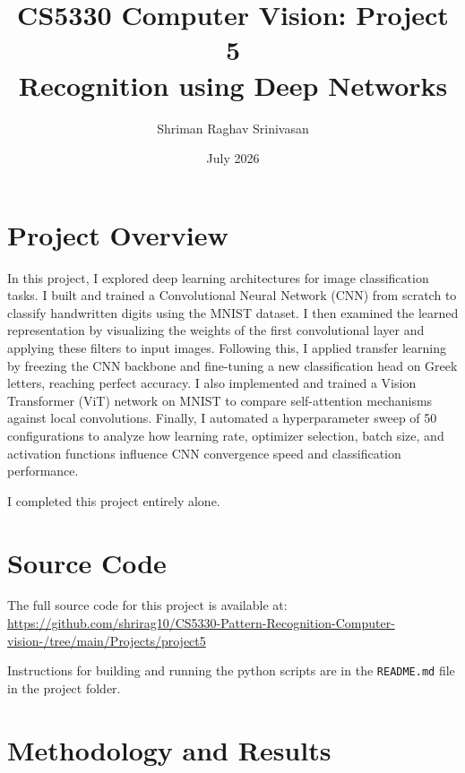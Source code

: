 \documentclass[11pt,letterpaper]{article}
\title{\textbf{CS5330 Computer Vision: Project 5}\\
       \large Recognition using Deep Networks}
\author{Shriman Raghav Srinivasan}
\date{July 2026}
\begin{document}
\maketitle

\section*{Project Overview}

In this project, I explored deep learning architectures for image classification tasks. I built and trained a Convolutional Neural Network (CNN) from scratch to classify handwritten digits using the MNIST dataset. I then examined the learned representation by visualizing the weights of the first convolutional layer and applying these filters to input images. Following this, I applied transfer learning by freezing the CNN backbone and fine-tuning a new classification head on Greek letters, reaching perfect accuracy. I also implemented and trained a Vision Transformer (ViT) network on MNIST to compare self-attention mechanisms against local convolutions. Finally, I automated a hyperparameter sweep of 50 configurations to analyze how learning rate, optimizer selection, batch size, and activation functions influence CNN convergence speed and classification performance.

I completed this project entirely alone.

\section*{Source Code}

The full source code for this project is available at:\\
\url{https://github.com/shrirag10/CS5330-Pattern-Recognition-Computer-vision-/tree/main/Projects/project5}

Instructions for building and running the python scripts are in the \texttt{README.md} file in the project folder.

\section*{Methodology and Results}
\end{document}
